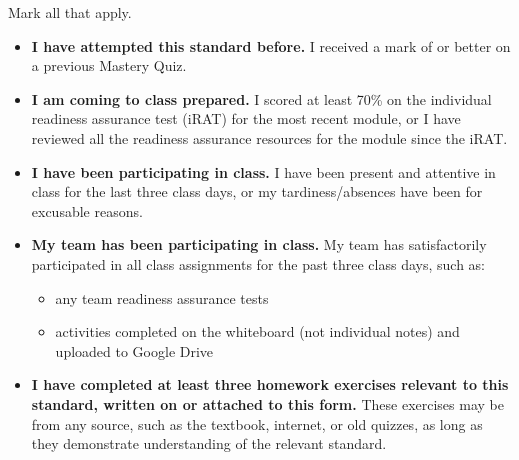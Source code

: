 \documentclass[12pt]{article}
\newcommand{\issuesMark}{{\fontencoding{U}\fontfamily{futs}\selectfont\char 66\relax}}
\begin{document}

\vspace{1em}



\renewcommand\labelitemi{\(\square\)}
Mark all that apply.
\begin{itemize}
  \item \textbf{I have attempted this standard before.}
        I received a mark of \issuesMark{} or better on a previous Mastery Quiz.
  \item \textbf{I am coming to class prepared.}
        I scored at least 70\% on the individual readiness assurance test (iRAT)
        for the most recent module, or I have reviewed all the
        readiness assurance resources for the module since the iRAT.
  \item \textbf{I have been participating in class.}
        I have been present and attentive in class for the last three
        class days,
        or my tardiness/absences have been for excusable reasons.
  \item \textbf{My team has been participating in class.}
        My team has satisfactorily participated in all class assignments
        for the past three class days, such as:
    \begin{itemize}
      \item any team readiness assurance tests
      \item activities completed on the whiteboard (not individual notes)
            and uploaded to Google Drive
    \end{itemize}
  \item \textbf{I have completed at least three homework exercises
        relevant to this standard, written on or attached to
        this form.}
        These exercises may be from any source, such as the textbook,
        internet, or old quizzes, as long as they demonstrate understanding
        of the relevant standard.
\end{itemize}
\end{document}
